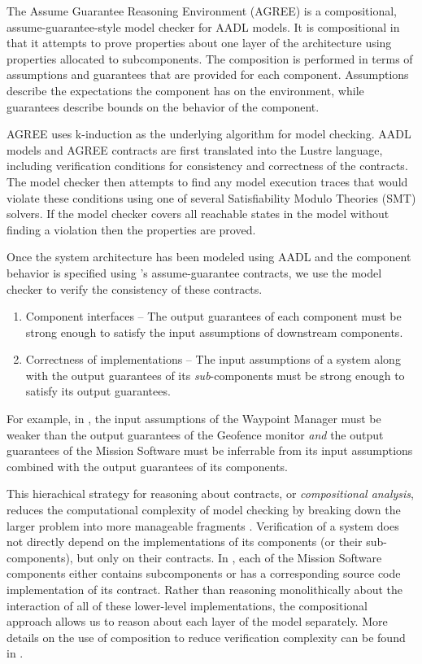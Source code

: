 
The Assume Guarantee Reasoning Environment (AGREE) is a compositional, assume-guarantee-style model
checker for AADL models. It is compositional in that it attempts to prove properties about one layer
of the architecture using properties allocated to subcomponents. The composition is performed in
terms of assumptions and guarantees that are provided for each component. Assumptions describe the
expectations the component has on the environment, while guarantees describe bounds on the behavior
of the component. 

AGREE uses k-induction as the underlying algorithm for model checking.  AADL models and AGREE
contracts are first translated into the Lustre language, including verification conditions for consistency
and correctness of the contracts.  The model checker then attempts to find any model execution traces
that would violate these conditions using one of several Satisfiability Modulo Theories (SMT) solvers. 
If the model checker covers all reachable states in the model without finding a violation then the properties are proved. 

Once the system architecture has been modeled using AADL
and the component behavior is specified using \agree's assume-guarantee contracts,
we use the \agree{} model checker to verify the consistency of these contracts.

\begin{enumerate}
\item Component interfaces -- The output guarantees of each component must be strong enough to
satisfy the input assumptions of downstream components. 
\item Correctness of implementations -- The input assumptions of a system along with the 
output guarantees of its \emph{sub}-components must be strong enough to satisfy its output guarantees.
\end{enumerate}

For example, in ,
the input assumptions of the Waypoint Manager must be weaker than
the output guarantees of the Geofence monitor 
\textit{and} the output guarantees of the Mission Software must be inferrable from
its input assumptions combined with the output guarantees of its components.

This hierachical strategy for reasoning about contracts,
or \emph{compositional analysis},
reduces the computational complexity of model checking
by breaking down the larger problem into more manageable fragments \cite{compositional-analysis-agree}.
Verification of a system does not directly depend on the implementations of its components (or their sub-components),
but only on their contracts.  
In , each of the Mission Software components either contains subcomponents 
or has a corresponding source code implementation of its contract.  
Rather than reasoning monolithically about the interaction of all of these lower-level implementations, 
the compositional approach allows us to reason about each layer of the model separately.  
More details on the use of composition to reduce verification complexity can be found in \cite{case-models-2021}.
